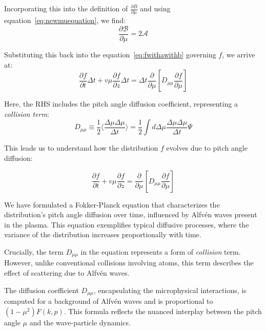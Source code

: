 Incorporating this into the definition of $\frac{\partial B}{\partial \mu}$ and using equation~\ref{eq:newmuequation}, we find:
%
\begin{equation}
\frac{\partial \mathcal B}{\partial \mu} = 2 \mathcal A
\end{equation}

Substituting this back into the equation~\ref{eq:fwithawithb} governing \( f \), we arrive at:
%
\begin{equation}
\frac{\partial f}{\partial t} \Delta t  +  v \mu \frac{\partial f}{\partial z} \Delta t = 
\Delta t \frac{\partial}{\partial\mu} \left[D_{\mu\mu}\frac{\partial f}{\partial\mu}\right]
\end{equation}

Here, the RHS includes the pitch angle diffusion coefficient, representing a \emph{collision term}:
%
\begin{equation}
D_{\mu\mu} \equiv \frac{1}{2}\langle \frac{\Delta\mu\Delta\mu}{\Delta t}\rangle = \frac{1}{2} \int d \Delta\mu \frac{\Delta\mu\Delta\mu}{\Delta t} \Psi
\end{equation}

This leads us to understand how the distribution \( f \) evolves due to pitch angle diffusion:
%
\begin{remark}
\begin{equation}\label{eq:fdiffmu}
\frac{\partial f}{\partial t} +v\mu \frac{\partial f}{\partial z} = \frac{\partial}{\partial\mu}\left[D_{\mu\mu}\frac{\partial f}{\partial\mu}  \right]
\end{equation}
\end{remark}

We have formulated a Fokker-Planck equation that characterizes the distribution's pitch angle diffusion over time, influenced by Alfvén waves present in the plasma. This equation exemplifies typical diffusive processes, where the variance of the distribution increases proportionally with time.

Crucially, the term \( D_{\mu\mu} \) in the equation represents a form of \emph{collision} term. However, unlike conventional collisions involving atoms, this term describes the effect of scattering due to Alfvén waves. 

The diffusion coefficient \( D_{\mu\mu} \), encapsulating the microphysical interactions, is computed for a background of Alfvén waves and is proportional to \( (1-\mu^2) F(k, p) \). This formula reflects the nuanced interplay between the pitch angle \( \mu \) and the wave-particle dynamics.

